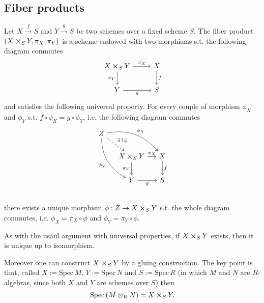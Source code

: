 \subsection{Fiber products}
\begin{defn}
	Let $X \xrightarrow{f} S$ and $Y \xrightarrow{g} S$ be two schemes
	over a fixed scheme $S$.
	The fiber product $\left(X \cross_S Y, \pi_X, \pi_Y\right)$ is a scheme
	endowed with two morphisms s.t. the following diagram commutes
	\begin{equation}
	\begin{tikzcd}
		X \cross_S Y \arrow[r, "\pi_X", rightarrow] \arrow[d, "\pi_Y"', rightarrow] &
		X \arrow[d, "f", rightarrow] \\
		Y \arrow[r, "g"', rightarrow] &
		S
	\end{tikzcd}
	\end{equation} 
	and satisfies the following universal property.
	For every couple of morphism $\phi_X$ and $\phi_Y$ s.t.
	$f \circ \phi_X = g \circ \phi_Y$, i.e. the following diagram commutes
	\begin{equation}
	\begin{tikzcd}[column sep=small]
		Z \arrow[rd, "\exists\, !\, \phi", dashrightarrow] \arrow[rrd, "\phi_X", rightarrow, bend left] 
		\arrow[rdd, "\phi_Y"', rightarrow, bend right] & & \\
		&
		X \cross_S Y \arrow[r, "\pi_X", rightarrow] \arrow[d, "\pi_Y"', rightarrow] &
		X \arrow[d, "f", rightarrow] \\
		&
		Y \arrow[r, "g"', rightarrow] &
		S\\
	\end{tikzcd}
	\end{equation} 
	there exists a unique morphism $\phi: Z \to X \cross_S Y$ s.t. the whole diagram commutes,
	i.e. $\phi_X = \pi_X \circ \phi$ and $\phi_Y = \pi_Y \circ \phi$.
\end{defn}

\begin{rem}[]
	As with the usaul argument with universal properties, if $X \cross_S Y$ exists,
	then it is unique up to isomorphism.
	
	Moreover one can construct $X \cross_S Y$ by a gluing construction.
	The key point is that, called $X := \mathrm{Spec}\, M$, $Y := \mathrm{Spec}\, N$
	and $S := \mathrm{Spec}\, R$
	(in which $M$ and $N$ are $R$-algebras, since both $X$ and $Y$ are schemes over $S$)
	then
	\begin{equation}
		\mathrm{Spec} \left( M \otimes_R N \right) = X \cross_S Y
	.\end{equation} 
\end{rem}

